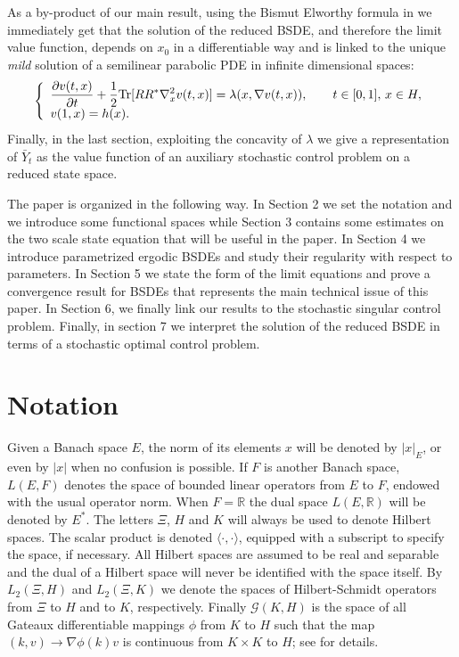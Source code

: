 \documentclass[reqno,a4paper,11 pt]{article}
\numberwithin{equation}{section}
\begin{document}
 As a by-product of our main result, using the Bismut Elworthy formula in \cite{FuTes_BE} we immediately get that the solution of the reduced BSDE, and therefore the limit value function, depends on $x_0$ in a differentiable way  and is linked to the unique \textit{mild} solution of a semilinear parabolic PDE in infinite dimensional spaces:
$$ \left\{\begin{array}{l}\displaystyle
\frac{\partial v(t,x)}{\partial t}+\frac{1}{2}\hbox{Tr}[RR^*\nabla^2_x  v(t,x)] = \lambda (
x,\nabla v(t,x)),\qquad t\in [0,1],\,
x\in H,\\
\displaystyle v(1,x)=h(x).
\end{array}\right.
$$
Finally, in the last section, exploiting the concavity of $\lambda$ we give a representation  of $\bar{Y}_t$ as the value function of an auxiliary stochastic control problem on a reduced state space. 



\smallskip
The paper is organized in the following way. In Section 2 we set the notation and we introduce some  functional spaces  while Section 3 contains some estimates on the two scale state equation that will be useful in the paper.
In Section 4 we introduce parametrized ergodic BSDEs and study their regularity with respect to parameters. In Section 5 we state the form of the limit equations and prove a convergence result for BSDEs that represents  the main technical issue of this paper. In Section 6, we finally link our results to the stochastic singular control problem. Finally, in section 7 we interpret the solution of the reduced BSDE in terms of a stochastic optimal control problem.




\section{Notation }
Given a Banach space $E$,
the norm of its elements $x$ will be denoted
by $|x |_E$, or even by $|x|$ when no confusion is possible. If $F$ is
another Banach space, $L(E,F)$ denotes the space of bounded linear
operators from $E$ to $F$, endowed with the usual operator norm. When $F=\mathbb{R}$ the dual space $L(E,\mathbb{R})$ will be denoted by $E^*$.  
The letters $\Xi$, $H$ and $K$ will always be used to denote Hilbert spaces.
The scalar product is denoted $\langle \cdot, \cdot \rangle$, equipped with a
subscript to specify the space, if necessary. All  Hilbert
spaces are assumed to be real and separable and  the dual of a Hilbert space will never be identified with the space itself. By $L_2(\Xi,H)$ and
$L_2(\Xi,K)$
 we denote the spaces of Hilbert-Schmidt operators from $\Xi $ to $H$
 and to $K$, respectively. Finally  $\mathcal{G}(K,H)$ is the space of all  Gateaux differentiable mappings $\phi$
 from $K$ to $H$ such that the map $(k,v)\rightarrow \nabla \phi(k)v$ is continuous from $K\times K$ to $H$; see \cite{FuTes} for details.
 \vspace{5pt}
\end{document}
